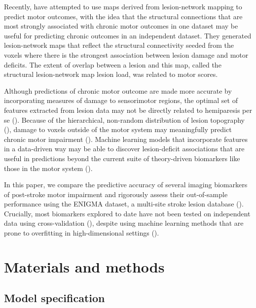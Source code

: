 \documentclass[10pt]{article}
\begin{document}
Recently, \cite{Bowren2022-rs} have attempted to use maps derived from lesion-network mapping to predict motor outcomes, with the idea that the structural connections that are most strongly associated with chronic motor outcomes in one dataset may be useful for predicting chronic outcomes in an independent dataset. They generated lesion-network maps that reflect the structural connectivity seeded from the voxels where there is the strongest association between lesion damage and motor deficits. The extent of overlap between a lesion and this map, called the structural lesion-network map lesion load, was related to motor scores.   

Although predictions of chronic motor outcome are made more accurate by incorporating measures of damage to sensorimotor regions, the optimal set of features extracted from lesion data may not be directly related to hemiparesis per se (\cite{Bzdok2020-py, Sperber2021-lw}). Because of the hierarchical, non-random distribution of lesion topography (\cite{Mah2014-cb,Wang2019-dz}), damage to voxels outside of the motor system may meaningfully predict chronic motor impairment (\cite{Sperber2021-lw}). Machine learning models that incorporate features in a data-driven way may be able to discover lesion-deficit associations that are useful in predictions beyond the current suite of theory-driven biomarkers like those in the motor system (\cite{Kasties2021-rm, Calesella2021-kp}).





In this paper, we compare the predictive accuracy of several imaging biomarkers of post-stroke motor impairment and rigorously assess their out-of-sample performance using the ENIGMA dataset, a multi-site stroke lesion database (\cite{Liew2020-ps}).
Crucially, most biomarkers explored to date have not been tested on independent data using cross-validation (\cite{Kim2017-xe}), despite using machine learning methods that are prone to overfitting in high-dimensional settings (\cite{Hastie2001-or}). 




\section{Materials and methods}


\subsection{Model specification}
\end{document}
